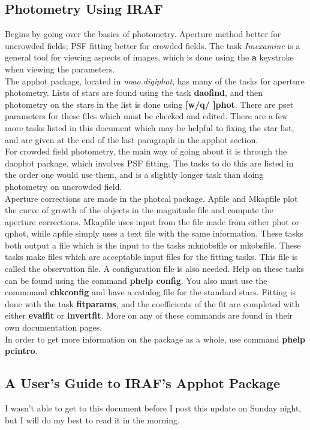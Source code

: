 \documentclass[a4paper]{article}
\begin{document}
\subsection{Photometry Using IRAF}
Begins by going over the basics of photometry.  Aperture method better for uncrowded fields; PSF fitting better for crowded fields.  The task \textit{Imexamine} is a general tool for viewing aspects of images, which is done using the \textbf{a} keystroke when viewing the parameters. \\
The apphot package, located in \textit{noao.digiphot}, has many of the tasks for aperture photometry.  Lists of stars are found using the task \textbf{daofind}, and then photometry on the stars in the list is done using \textbf{[w/q/ ]phot}.  There are pset parameters for these files which must be checked and edited.  There are a few more tasks listed in this document which may be helpful to fixing the star list, and are given at the end of the last paragraph in the apphot section. \\
For crowded field photometry, the main way of going about it is through the daophot package, which involves PSF fitting.  The tasks to do this are listed in the order one would use them, and is a slightly longer task than doing photometry on uncrowded field. \\
Aperture corrections are made in the photcal package.  Apfile and Mkapfile plot the curve of growth of the objects in the magnitude file and compute the aperture corrections.  Mkapfile uses input from the file made from either phot or qphot, while apfile simply uses a text file with the same information.  These tasks both output a file which is the input to the tasks mknobsfile or mkobsfile.  These tasks make files which are acceptable input files for the fitting tasks.  This file is called the observation file.  A configuration file is also needed.  Help on these tasks can be found using the command \textbf{phelp config}.  You also must use the commmand \textbf{chkconfig} and have a catalog file for the standard stars.  Fitting is done with the task \textbf{fitparams}, and the coefficients of the fit are completed with either \textbf{evalfit} or \textbf{invertfit}.  More on any of these commands are found in their own documentation pages. \\
In order to get more information on the package as a whole, use command \textbf{phelp pcintro}.

\subsection{A User's Guide to IRAF's Apphot Package}
I wasn't able to get to this document before I post this update on Sunday night, but I will do my best to read it in the morning.
\end{document}
